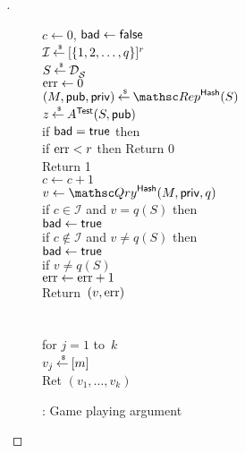 \begin{proof}[]
\begin{figure}
{{$c\gets 0$, $\mathsf{bad} \gets \mathsf{false}$\\
$\mathcal{I}{\:\stackrel{{\scriptscriptstyle \hspace{0.2em}\$}} {\leftarrow}\:} [\{1,2,\ldots,q\}]^r$\\
$S {\:\stackrel{{\scriptscriptstyle \hspace{0.2em}\$}} {\leftarrow}\:} \mathcal{D}_{{\cal S}}^{}$\\
$\mathrm{err} \gets 0$\\
$(M,\pubaux,\privaux) \getsr \Rep^{\HashOracle}(S)$\\
$z {\:\stackrel{{\scriptscriptstyle \hspace{0.2em}\$}} {\leftarrow}\:} A^{\mathsf{Test}}(S,{\sf pub})$\\
if $\mathsf{bad} = \mathsf{true}$ then \\
if $\mathrm{err}  < r$ then Return 0\\
Return 1
}
%
{
\\
$c \gets c+1$\\
$v \gets \Qry^{\HashOracle}(M,\privaux,q)$\\
if $c \in \mathcal{I}$ and $v = q(S)$ then \\
\nudge $\mathsf{bad} \gets \mathsf{true}$ \\
if $c \not\in \mathcal{I}$ and $v \neq q(S)$ then \\
\nudge $\mathsf{bad} \gets \mathsf{true}$\\
if $v \neq q(S)$\\
\nudge $\mathrm{err} \gets\mathrm{err} +1$\\
Return~$(v,\mathrm{err} )$\\\\
%
\\
for $j = 1$ to~$k$\\
\nudge $v_j {\:\stackrel{{\scriptscriptstyle \hspace{0.2em}\$}} {\leftarrow}\:} [m]$\\
Ret $\left(v_1,\ldots,v_k\right)$
}
}
\caption{: Game playing argument}\label{fig:2TGame}
\end{figure}


\end{proof}
